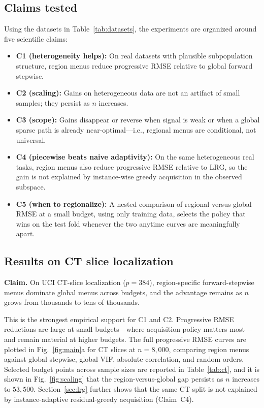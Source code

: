 \documentclass[pdflatex,sn-basic,Numbered]{sn-jnl}
\begin{document}
\subsection{Claims tested}

Using the datasets in Table~\ref{tab:datasets}, the experiments are organized around five scientific claims:
\begin{itemize}
  \item \textbf{C1 (heterogeneity helps):} On real datasets with plausible subpopulation structure, region menus reduce progressive RMSE relative to global forward stepwise.
  \item \textbf{C2 (scaling):} Gains on heterogeneous data are not an artifact of small samples; they persist as \(n\) increases.
  \item \textbf{C3 (scope):} Gains disappear or reverse when signal is weak or when a global sparse path is already near-optimal---i.e., regional menus are conditional, not universal.
  \item \textbf{C4 (piecewise beats naive adaptivity):} On the same heterogeneous real tasks, region menus also reduce progressive RMSE relative to LRG, so the gain is not explained by instance-wise greedy acquisition in the observed subspace.
  \item \textbf{C5 (when to regionalize):} A nested comparison of regional versus global RMSE at a small budget, using only training data, selects the policy that wins on the test fold whenever the two anytime curves are meaningfully apart.
\end{itemize}

\subsection{Results on CT slice localization}
\label{sec:ct}

\textbf{Claim.} On UCI CT-slice localization (\(p=384\)), region-specific forward-stepwise menus dominate global menus across budgets, and the advantage remains as \(n\) grows from thousands to tens of thousands.

This is the strongest empirical support for C1 and C2. Progressive RMSE reductions are large at small budgets---where acquisition policy matters most---and remain material at higher budgets. The full progressive RMSE curves are plotted in Fig.~\ref{fig:main}a for CT slices at \(n=8{,}000\), comparing region menus against global stepwise, global VIF, absolute-correlation, and random orders. Selected budget points across sample sizes are reported in Table~\ref{tab:ct}, and it is shown in Fig.~\ref{fig:scaling} that the region-versus-global gap persists as \(n\) increases to \(53{,}500\). Section~\ref{sec:lrg} further shows that the same CT split is not explained by instance-adaptive residual-greedy acquisition (Claim~C4).
\end{document}
